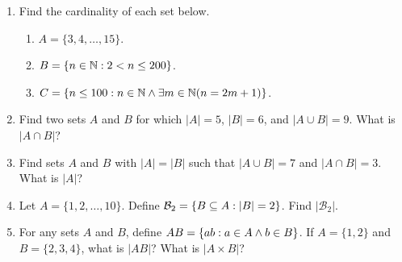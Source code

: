 \documentclass{book}
\begin{document}
\setcounter{project}{330}
\addtocounter{project}{-1}
\begin{investigation}[]\label{investigation-10}
\hypertarget{p-1996}{}%
\leavevmode%
\begin{enumerate}
\item\hypertarget{li-265}{}\hypertarget{p-1997}{}%
Find the cardinality of each set below. %
\begin{enumerate}
\item\hypertarget{li-266}{}\(A = \{3,4,\ldots, 15\}\).%
\item\hypertarget{li-267}{}\(B = \{n \in \mathbb N : 2 <  n \le 200\}\).%
\item\hypertarget{li-268}{}\(C = \{n \le 100 : n \in \mathbb N \wedge \exists m \in \mathbb N (n = 2m+1)\}\).%
\end{enumerate}
%
\item\hypertarget{li-269}{}\hypertarget{p-1998}{}%
Find two sets \(A\) and \(B\) for which \(|A| = 5\), \(|B| = 6\), and \(|A\cup B| = 9\). What is \(|A \cap B|\)?%
\item\hypertarget{li-270}{}\hypertarget{p-1999}{}%
Find sets \(A\) and \(B\) with \(|A| = |B|\) such that \(|A\cup B| = 7\) and \(|A \cap B| = 3\). What is \(|A|\)?%
\item\hypertarget{li-271}{}\hypertarget{p-2000}{}%
Let \(A = \{1,2,\ldots, 10\}\). Define \(\mathcal{B}_2 = \{B \subseteq A : |B| = 2\}\). Find \(|\mathcal{B}_2|\).%
\item\hypertarget{li-272}{}For any sets \(A\) and \(B\), define \(AB = \{ab : a\in A \wedge b \in B\}\). If \(A = \{1,2\}\) and \(B = \{2,3,4\}\), what is \(|AB|\)? What is \(|A \times B|\)?%
\end{enumerate}
%
\end{investigation}
\end{document}

